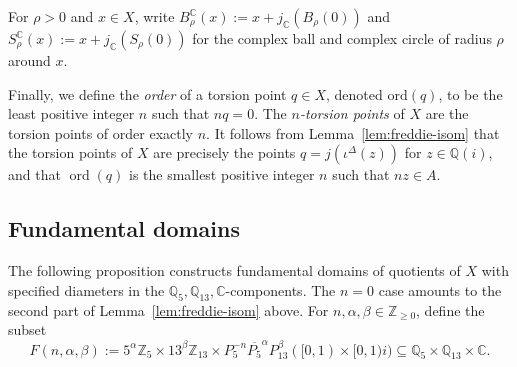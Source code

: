 \documentclass[11pt]{amsart}
\newcommand{\NK}[1]{\textcolor{olive}{\textsf{#1}}}
\theoremstyle{definition}
\newtheorem{definition}[lemma]{Definition}
\DeclareMathOperator{\ord}{ord}
\newcommand{\C}{{\mathbb C}}
\newcommand{\Q}{{\mathbb Q}}
\newcommand{\Z}{{\mathbb Z}}
\DeclareMathOperator{\dist}{dist}
\begin{document}
For $\rho>0$ and $x \in X$, write $B^{\C}_\rho(x):=x+j_{\C}(B_\rho(0))$ and $S^{\C}_\rho(x):=x+j_{\C}(S_\rho(0))$ for the complex ball and complex circle of radius $\rho$ around $x$.

Finally, we define the \emph{order} of a torsion point $q \in X$, denoted $\mathrm{ord}(q)$, to be the least positive integer $n$ such that $nq = 0$.  The \emph{$n$-torsion points} of $X$ are the torsion points of order exactly $n$.  It follows from Lemma~\ref{lem:freddie-isom} that the torsion points of $X$ are precisely the points $q=j(\iota^{\Delta}(z))$ for $z \in \Q(i)$, and that $\ord(q)$ is the smallest positive integer $n$ such that $nz \in A$.






\subsection{Fundamental domains}\label{sec:fundamental-domains}
The following proposition constructs fundamental domains of quotients of $X$ with specified diameters in the $\Q_5,\Q_{13},\C$-components.  The $n=0$ case amounts to the second part of Lemma~\ref{lem:freddie-isom} above.  For $n,\alpha, \beta \in \Z_{\geq 0}$, define the subset
$$F(n,\alpha,\beta):=5^\alpha \mathbb{Z}_5\times 13^\beta \mathbb{Z}_{13} \times P_5^{-n}\overline{P_5}^\alpha P_{13}^\beta ([0,1) \times [0,1)i) \subseteq \Q_5 \times \Q_{13} \times \C.$$
\end{document}
